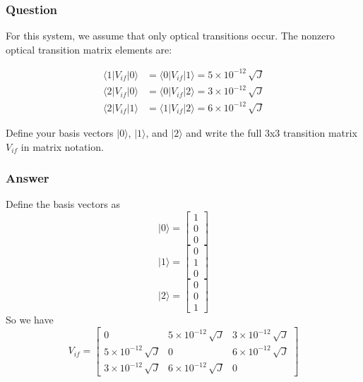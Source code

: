 \documentclass[12pt]{article}
\begin{document}
\subsubsection{Question}
For this system, we assume that only optical transitions occur. The nonzero optical transition matrix elements are:

\begin{align}
\langle 1|V_{if}|0 \rangle &= \langle 0|V_{if}|1 \rangle = 5 \times 10^{-12} \, \sqrt{J} \\
\langle 2|V_{if}|0 \rangle &= \langle 0|V_{if}|2 \rangle = 3 \times 10^{-12} \, \sqrt{J} \\
\langle 2|V_{if}|1 \rangle &= \langle 1|V_{if}|2 \rangle = 6 \times 10^{-12} \, \sqrt{J}
\end{align}

Define your basis vectors \(|0\rangle\), \(|1\rangle\), and \(|2\rangle\) and write the full 3x3 transition matrix \(V_{if}\) in matrix notation.
\subsubsection{Answer}
Define the basis vectors as
\begin{equation}
    |0\rangle = \begin{bmatrix}
    1 \\
    0 \\
    0
    \end{bmatrix}
\end{equation}
\begin{equation}
    |1\rangle = \begin{bmatrix}
    0 \\
    1 \\
    0
    \end{bmatrix}
\end{equation}
\begin{equation}
    |2\rangle = \begin{bmatrix}
    0 \\
    0 \\
    1
    \end{bmatrix}
\end{equation}
So we have
\begin{equation}
    V_{if} = \begin{bmatrix}
    0 & 5 \times 10^{-12} \, \sqrt{J} & 3 \times 10^{-12} \, \sqrt{J} \\
    5 \times 10^{-12} \, \sqrt{J} & 0 & 6 \times 10^{-12} \, \sqrt{J} \\
    3 \times 10^{-12} \, \sqrt{J} & 6 \times 10^{-12} \, \sqrt{J} & 0
    \end{bmatrix}
\end{equation}
\end{document}
